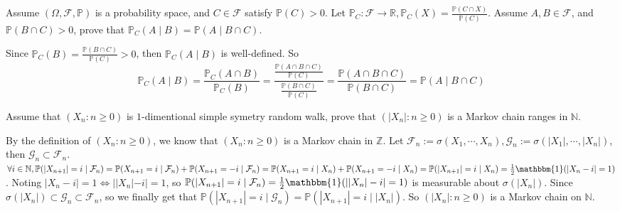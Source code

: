 \documentclass{ctexart}
\newif\ifpreface
\begin{document}
\large
\setlength{\baselineskip}{1.2em}
\ifpreface
  
\else
\fi
{}
\begin{problem}\label{pro:1}
  Assume \((\Omega,\mathcal{F},\mathbb{P})\) is a probability space, and \(C \in \mathcal{F}\) satisfy \(\mathbb{P}(C)>0\).
  Let \(\mathbb{P}_C:\mathcal{F} \to \mathbb{R},\mathbb{P}_C(X)=\frac{\mathbb{P}(C \cap X)}{\mathbb{P}(C)}\).
  Assume \(A,B \in \mathcal{F}\), and \(\mathbb{P}(B \cap C)>0\), prove that
  \(\mathbb{P}_C(A \mid B) = \mathbb{P}(A \mid B \cap C)\).
\end{problem}
\begin{solution}
  Since \(\mathbb{P}_C(B)=\frac{\mathbb{P}(B \cap C)}{\mathbb{P}(C)}>0\), then \(\mathbb{P}_C(A \mid B)\) is well-defined.
  So
  \[
    \mathbb{P}_C(A \mid B)=\frac{\mathbb{P}_C(A \cap B)}{\mathbb{P}_C(B)}=\frac{\frac{\mathbb{P}(A \cap B \cap C)}{\mathbb{P}(C)}}{\frac{\mathbb{P}(B \cap C)}{\mathbb{P}(C)}}=\frac{\mathbb{P}(A \cap B \cap C)}{\mathbb{P}(B \cap C)}=\mathbb{P}(A \mid B \cap C)
  \]
\end{solution}
\begin{problem}\label{pro:2}
  Assume that \((X_n:n \geq 0)\) is \(1\)-dimentional simple symetry random walk, prove that \((|X_n|:n \geq 0)\) is a Markov chain ranges in \(\mathbb{N}\).
\end{problem}
\begin{solution}
  By the definition of \((X_n:n \geq 0)\), we know that \((X_n:n \geq 0)\) is a Markov chain in \(\mathbb{Z}\).
  Let \(\mathcal{F}_n:=\sigma(X_1,\cdots,X_n),\mathcal{G}_n:=\sigma(|X_1|,\cdots,|X_n|)\), then \(\mathcal{G}_n \subset \mathcal{F}_n\).
  \(\forall i \in \mathbb{N}, \mathbb{P}(|X_{n+1}|=i \mid \mathcal{F}_n)=\mathbb{P}(X_{n+1}=i \mid \mathcal{F}_n)+\mathbb{P}(X_{n+1}=-i \mid \mathcal{F}_n)=\mathbb{P}(X_{n+1}=i \mid X_n)+\mathbb{P}(X_{n+1}=-i \mid X_n)=\mathbb{P}(|X_{n+1}|=i \mid X_n)=\frac{1}{2}\mathbbm{1}(|X_n-i|=1)\).
  Noting \(|X_n-i|=1 \iff ||X_n|-i|=1\), so \(\mathbb{P}(|X_{n+1}|=i \mid \mathcal{F}_n)=\frac{1}{2}\mathbbm{1}(||X_n|-i|=1)\) is measurable about \(\sigma(|X_n|)\).
  Since \(\sigma(|X_n|)\subset \mathcal{G}_n \subset \mathcal{F}_n\), so we finally get that
  \(\mathbb{P}(|X_{n+1}|=i \mid \mathcal{G}_n)=\mathbb{P}(|X_{n+1}|=i \mid |X_n|)\).
  So \((|X_n|:n \geq 0)\) is a Markov chain on \(\mathbb{N}\).
\end{solution}
\end{document}
